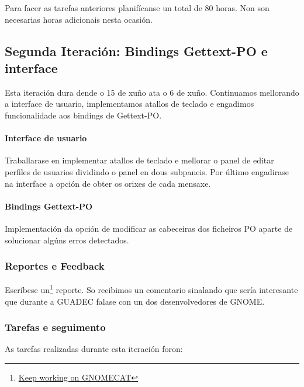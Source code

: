 Para facer as tarefas anteriores planifícanse un total de 80 horas. Non son necesarias horas adicionais nesta ocasión.

\subsection{Segunda Iteración: Bindings Gettext-PO e interface}
Esta iteración dura dende o 15 de xuño ata o 6 de xuño. Continuamos mellorando a interface de usuario, implementamos atallos de teclado e engadimos funcionalidade aos bindings de Gettext-PO.

\paragraph{Interface de usuario} Traballarase en implementar atallos de teclado e mellorar o panel de editar perfiles de usuarios dividindo o panel en dous subpaneis. Por último engadirase na interface a opción de obter os orixes de cada mensaxe.

\paragraph{Bindings Gettext-PO} Implementación da opción de modificar as cabeceiras dos ficheiros PO aparte de solucionar algúns erros detectados.

\subsubsection{Reportes e Feedback}

Escríbese un\footnote{\href{http://aquelando.info/keep-working-on-gnomecat/}{Keep working on GNOMECAT}} reporte. So recibimos un comentario sinalando que sería interesante que durante a GUADEC falase con un dos desenvolvedores de GNOME.

\subsubsection{Tarefas e seguimento}

As tarefas realizadas durante esta iteración foron:

